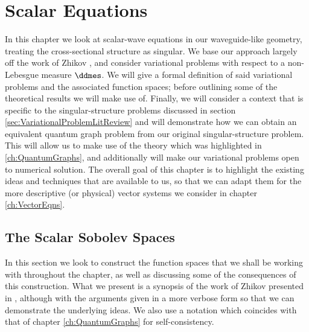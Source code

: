 \chapter{Scalar Equations} \label{ch:ScalarEqns}
In this chapter we look at scalar-wave equations in our waveguide-like geometry, treating the cross-sectional structure as singular.
We base our approach largely off the work of Zhikov \cite{zhikov2000extension}, and consider variational problems with respect to a non-Lebesgue measure $\ddmes$.
We will give a formal definition of said variational problems and the associated function spaces; before outlining some of the theoretical results we will make use of.
Finally, we will consider a context that is specific to the singular-structure problems discussed in section \ref{sec:VariationalProblemLitReview} and will demonstrate how we can obtain an equivalent quantum graph problem from our original singular-structure problem.
This will allow us to make use of the theory which was highlighted in \ref{ch:QuantumGraphs}, and additionally will make our variational problems open to numerical solution.
The overall goal of this chapter is to highlight the existing ideas and techniques that are available to us, so that we can adapt them for the more descriptive (or physical) vector systems we consider in chapter \ref{ch:VectorEqns}.

\section{The Scalar Sobolev Spaces} \label{sec:ScalarSobSpaces}
In this section we look to construct the function spaces that we shall be working with throughout the chapter, as well as discussing some of the consequences of this construction.
What we present is a synopsis of the work of Zhikov presented in \cite{zhikov2000extension}, although with the arguments given in a more verbose form so that we can demonstrate the underlying ideas. 
We also use a notation which coincides with that of chapter \ref{ch:QuantumGraphs} for self-consistency. \newline

